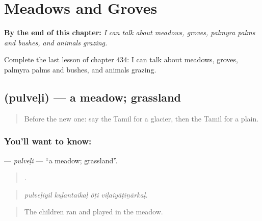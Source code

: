 
\chapter{Meadows and Groves}
\label{ch:ta-meadows-and-groves}

\begin{chapteropening}
\textbf{By the end of this chapter:} \emph{I can talk about meadows, groves, palmyra palms and bushes, and animals grazing.}

Complete the last lesson of chapter 434: I can talk about meadows, groves, palmyra palms and bushes, and animals grazing.
\end{chapteropening}

\section[\texorpdfstring{\ta{புல்வெளி} (pulveḷi)}{புல்வெளி (pulveḷi)}]{ (pulveḷi) — a meadow; grassland}

\label{lesson:TA-C434-pulveli}



\begin{quote}
Before the new one: say the Tamil for a glacier, then the Tamil for a plain.
\end{quote}

\subsection*{You'll want to know: }
\textbf{} — \emph{pulveḷi} — \textquotedblleft{}a meadow; grassland\textquotedblright{}.

\begin{quote}
   .
\end{quote}

\begin{quote}
\emph{pulveḷiyil kuḻantaikaḷ ōṭi viḷaiyāṭiṉārkaḷ.}
\end{quote}

\begin{quote}
The children ran and played in the meadow.
\end{quote}


